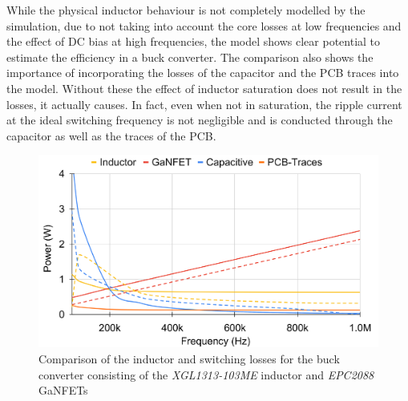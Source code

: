 While the physical inductor behaviour is not completely modelled by the simulation, due to not taking into account the core losses at low frequencies and the effect of \ac{DC} bias at high frequencies, the model shows clear potential to estimate the efficiency in a buck converter. The comparison also shows the importance of incorporating the losses of the capacitor and the \ac{PCB} traces into the model. Without these the effect of inductor saturation does not result in the losses, it actually causes. In fact, even when not in saturation, the ripple current at the ideal switching frequency is not negligible and is conducted through the capacitor as well as the traces of the \ac{PCB}.\\

\begin{figure}[H]
    \centering
    \includegraphics[width=0.85\linewidth]{Bilder/Kapitel4/XGL103_EPC2088_Simulation_Loss_Comparison.png}
    \caption{Comparison of the inductor and switching losses for the buck converter consisting of the \textit{XGL1313-103ME} inductor and \textit{EPC2088} \acp{GaNFET}}
    \label{fig:xgl103_epc2088_loss_comparison}
\end{figure}

